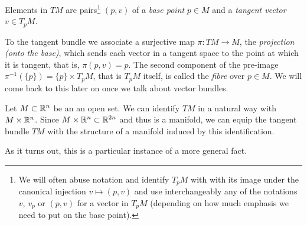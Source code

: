 Elements in $TM$ are pairs\footnote{We will often abuse notation and identify $T_pM$ with with its image under the canonical injection $v\mapsto(p,v)$ and use interchangeably any of the notations $v$, $v_p$ or $(p,v)$ for a vector in $T_pM$ (depending on how much emphasis we need to put on the base point).} $(p,v)$ of a \emph{base point} $p\in M$ and a \emph{tangent vector} $v\in T_pM$.

To the tangent bundle we associate a surjective map $\pi:TM \to M$, the \emph{projection (onto the base)}, which sends each vector in a tangent space to the point at which it is tangent, that is, $\pi(p,v) = p$.
The second component of the pre-image $\pi^{-1}(\{p\}) = \{p\}\times T_pM$, that is $T_pM$ itself, is called the \emph{fibre} over $p\in M$.
We will come back to this later on once we talk about vector bundles.

\begin{example}
	Let $M\subset \mathbb{R}^n$ be an an open set.
	We can identify $TM$ in a natural way with $M\times\mathbb{R}^n$.
	Since $M\times\mathbb{R}^n \subset \mathbb{R}^{2n}$ and thus is a manifold, we can equip the tangent bundle $TM$ with the structure of a manifold induced by this identification.
\end{example}

As it turns out, this is a particular instance of a more general fact.

